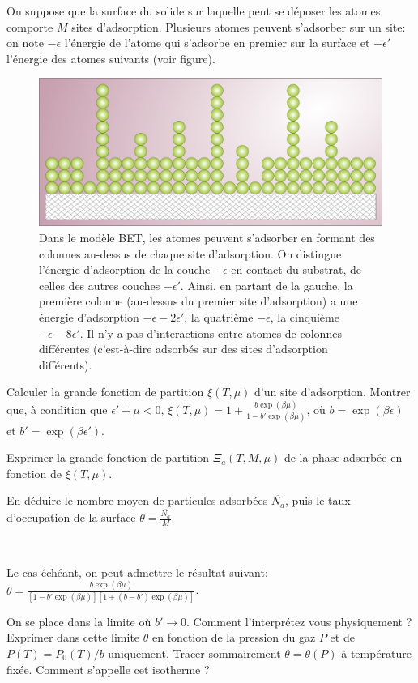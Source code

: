 On suppose que la surface du solide sur laquelle peut se déposer les atomes comporte $M$ sites d'adsorption. Plusieurs atomes peuvent s'adsorber sur un site: on note $-\epsilon$ l'énergie de l'atome qui s'adsorbe en premier sur la surface et $-\epsilon'$ l'énergie des  atomes suivants (voir figure).
\begin{figure}[!t]
\centerline{\includegraphics[height=.3\textwidth]{../Fig/BET_Multilayer_Adsorption}}
\caption{Dans le modèle BET, les atomes peuvent s'adsorber en formant des colonnes au-dessus de chaque site d'adsorption. On distingue l'énergie d'adsorption de la couche $-\epsilon$ en contact du substrat, de celles des autres couches $-\epsilon'$. Ainsi, en partant de la gauche, la première colonne (au-dessus du premier site d'adsorption) a une énergie d'adsorption $-\epsilon - 2 \epsilon'$, la quatrième $-\epsilon$, la cinquième $-\epsilon - 8 \epsilon'$. Il n'y a pas d'interactions entre atomes de colonnes différentes (c'est-à-dire adsorbés sur des sites d'adsorption différents). }
\end{figure}

\question Calculer la grande fonction de partition $\xi(T,\mu)$ d'un site d'adsorption. Montrer que, à condition que $\epsilon'+\mu<0$,  
$\xi(T,\mu)=1+\frac{b \exp(\beta \mu)}{1-b'\exp(\beta \mu)}$, où $b=\exp(\beta \epsilon)$ et $b'=\exp(\beta \epsilon')$.

\question Exprimer la grande fonction de partition $\Xi_a(T,M,\mu)$ de la phase adsorbée en fonction de $\xi(T,\mu)$.

\question En déduire le nombre moyen de particules adsorbées $\overline{N_a}$, puis le taux d'occupation de la surface $\theta=\frac{\overline{N_a}}{M}$. 

\

Le cas échéant, on peut admettre le résultat suivant: $\theta=\frac{b \exp(\beta \mu)}{[1-b' \exp(\beta \mu)][1+(b-b') \exp(\beta \mu)]}$.

\question On se place dans la limite où $b' \rightarrow 0$. Comment l'interprétez vous physiquement ? Exprimer dans cette limite $\theta$ en fonction de la pression du gaz $P$ et de $P(T)=P_0(T)/b$ uniquement. Tracer sommairement $\theta=\theta(P)$ à température fixée. Comment s'appelle cet isotherme ?

